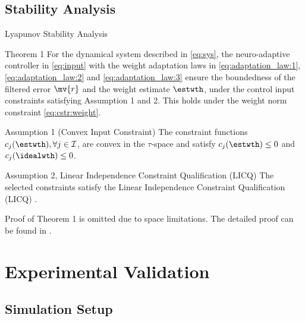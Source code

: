 \documentclass[8pt, aspectratio=169]{beamer}
\begin{document}
\subsection{Stability Analysis}

\begin{frame}{\insertsubsectionhead}{Lyapunov Stability Analysis}

  \begin{block}{Theorem 1 \cite{Ryu:2025aa}}
    For the dynamical system described in \eqref{eq:sys}, the neuro-adaptive controller in \eqref{eq:input} with the weight adaptation laws in \eqref{eq:adaptation_law:1}, \eqref{eq:adaptation_law:2} and \eqref{eq:adaptation_law:3} ensure the boundedness of the filtered error $\mv{r}$ and the weight estimate $\estwth$, under the control input constraints satisfying Assumption 1 and 2. This holds under the weight norm constraint \eqref{eq:cstr:weight}.
  \end{block}

  \begin{exampleblock}{Assumption 1 (Convex Input Constraint)}
    The constraint functions $c_j(\estwth),\forall j\in\mathcal{I}$, are convex in the $\tau$-space and satisfy $c_j(\estwth)\le0$ and $c_j(\idealwth)\le0$.
  \end{exampleblock}

  \begin{exampleblock}{Assumption 2, Linear Independence Constraint Qualification (LICQ)}
    The selected constraints satisfy the Linear Independence Constraint Qualification (LICQ) \cite[Chap. 12 Def. 12.1]{Nocedal:2006aa}.
  \end{exampleblock}

  Proof of Theorem 1 is omitted due to space limitations. The detailed proof can be found in \cite{Ryu:2025aa}.

\end{frame}

\section{Experimental Validation}

\subsection{Simulation Setup}
\end{document}
